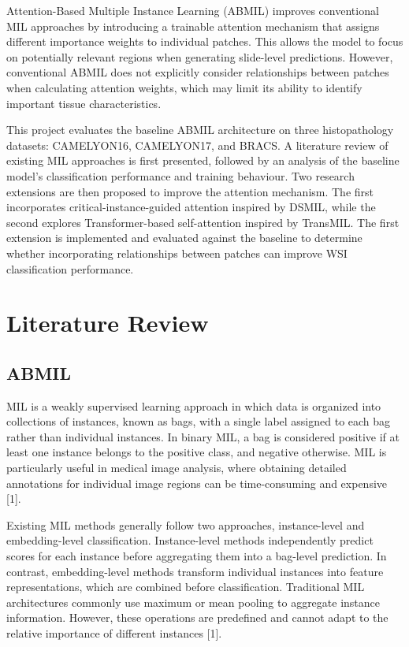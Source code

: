 \documentclass[journal]{IEEEtran}
\begin{document}
Attention-Based Multiple Instance Learning (ABMIL) improves conventional MIL approaches by introducing a trainable attention mechanism that assigns different importance weights to individual patches. This allows the model to focus on potentially relevant regions when generating slide-level predictions. However, conventional ABMIL does not explicitly consider relationships between patches when calculating attention weights, which may limit its ability to identify important tissue characteristics.

This project evaluates the baseline ABMIL architecture on three histopathology datasets: CAMELYON16, CAMELYON17, and BRACS. A literature review of existing MIL approaches is first presented, followed by an analysis of the baseline model's classification performance and training behaviour. Two research extensions are then proposed to improve the attention mechanism. The first incorporates critical-instance-guided attention inspired by DSMIL, while the second explores Transformer-based self-attention inspired by TransMIL. The first extension is implemented and evaluated against the baseline to determine whether incorporating relationships between patches can improve WSI classification performance.

\section{Literature Review}
\subsection{ABMIL}

MIL is a weakly supervised learning approach in which data is organized into collections of instances, known as bags, with a single label assigned to each bag rather than individual instances. In binary MIL, a bag is considered positive if at least one instance belongs to the positive class, and negative otherwise. MIL is particularly useful in medical image analysis, where obtaining detailed annotations for individual image regions can be time-consuming and expensive [1].

Existing MIL methods generally follow two approaches, instance-level and embedding-level classification. Instance-level methods independently predict scores for each instance before aggregating them into a bag-level prediction. In contrast, embedding-level methods transform individual instances into feature representations, which are combined before classification. Traditional MIL architectures commonly use maximum or mean pooling to aggregate instance information. However, these operations are predefined and cannot adapt to the relative importance of different instances [1].
\end{document}
